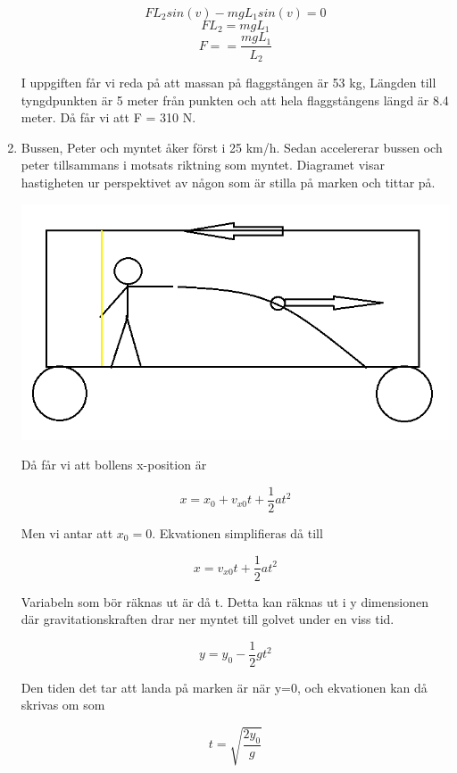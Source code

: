 \documentclass[a4paper,12pt]{article}
\begin{document}
\begin{enumerate}
            $$FL_2sin(v)-mgL_1sin(v)=0$$
            $$FL_2=mgL_1$$
            $$F==\frac{mgL_1}{L_2}$$

            I uppgiften får vi reda på att massan på flaggstången är 53 kg, Längden till
            tyngdpunkten är 5 meter från punkten och att hela flaggstångens längd
            är 8.4 meter. Då får vi att F = 310 N.

      \item

            Bussen, Peter och myntet åker först i 25 km/h. Sedan accelererar bussen
            och peter tillsammans i motsats riktning som myntet. Diagramet visar
            hastigheten ur perspektivet av någon som är stilla på marken och tittar
            på.

            \includegraphics[scale=0.5]{Figur3.png}

            Då får vi att bollens x-position är

            $$x=x_0+v_{x0}t+\frac{1}{2}at^2$$

            Men vi antar att $x_0=0$.
            Ekvationen simplifieras då till

            \begin{equation}
                  x=v_{x0}t + \frac{1}{2}at^2
            \end{equation}

            Variabeln som bör räknas ut är då t.
            Detta kan räknas ut i y dimensionen där gravitationskraften
            drar ner myntet till golvet under en viss tid.

            $$y=y_0-\frac{1}{2}gt^2$$

            Den tiden det tar att landa på marken är när y=0,
            och ekvationen kan då skrivas om som

            \begin{equation}
                  t=\sqrt{\frac{2y_0}{g}}
            \end{equation}


\end{enumerate}
\end{document}
